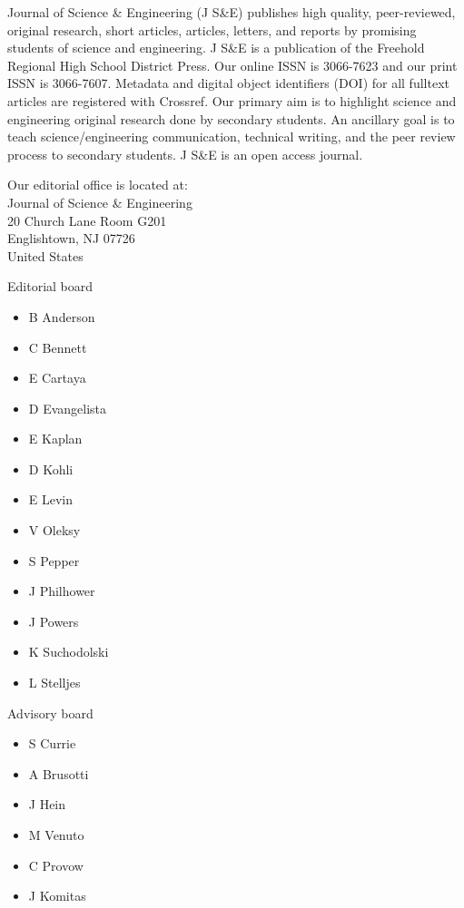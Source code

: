 \noindent Journal of Science \& Engineering (J S\&E) publishes high quality, peer-reviewed, original research, short articles, articles, letters, and reports by promising students of science and engineering.  J S\&E is a publication of the Freehold Regional High School District Press. Our online ISSN is 3066-7623 and our print ISSN is 3066-7607. Metadata and digital object identifiers (DOI) for all fulltext articles are registered with Crossref. Our primary aim is to highlight science and engineering original research done by secondary students. An ancillary goal is to teach science/engineering communication, technical writing, and the peer review process to secondary students. J S\&E is an open access journal.
\vspace{2ex}

\noindent Our editorial office is located at:\\

\noindent Journal of Science \& Engineering\\20 Church Lane Room G201\\Englishtown, NJ 07726\\United States
\vspace{2ex}

\noindent\small Editorial board
\begin{itemize}
\itemsep-0.5em
\item[] B Anderson
\item[] C Bennett
\item[] E Cartaya
\item[] D Evangelista
\item[] E Kaplan
\item[] D Kohli
\item[] E Levin
\item[] V Oleksy
\item[] S Pepper
\item[] J Philhower
\item[] J Powers
\item[] K Suchodolski
\item[] L Stelljes
\end{itemize}

\noindent\small Advisory board
\begin{itemize}
\itemsep-0.5em
\item[] S Currie
\item[] A Brusotti
\item[] J Hein
\item[] M Venuto
\item[] C Provow
\item[] J Komitas
\end{itemize}

